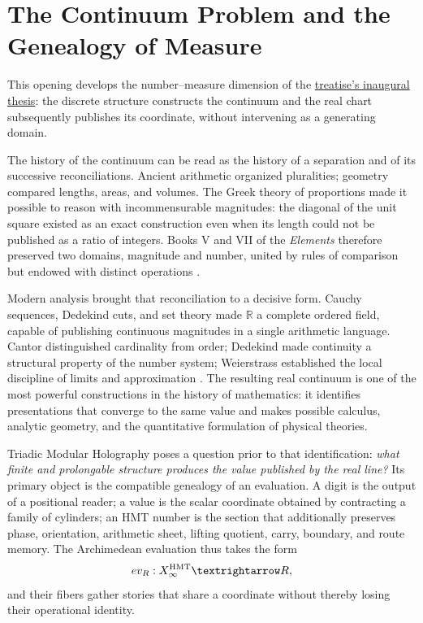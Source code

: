 
\section{The Continuum Problem and the Genealogy of Measure}
\label{sec:continuo-numero-medida-hmt-revfinal}

This opening develops the number--measure dimension of the
\hyperref[sec:tesis-inaugural-helicoidal-hmt-md]{treatise's inaugural thesis}:
the discrete structure constructs the continuum and the real chart subsequently publishes
its coordinate, without intervening as a generating domain.

The history of the continuum can be read as the history of a separation and
of its successive reconciliations. Ancient arithmetic organized
pluralities; geometry compared lengths, areas, and volumes. The Greek
theory of proportions made it possible to reason with incommensurable magnitudes:
the diagonal of the unit square existed as an exact construction even when
its length could not be published as a ratio of integers. Books V and VII
of the \emph{Elements} therefore preserved two domains, magnitude and number,
united by rules of comparison but endowed with distinct operations
\cite{EuclidElements,SEPAristotleMath}.

Modern analysis brought that reconciliation to a decisive form. Cauchy sequences, Dedekind cuts, and set theory made \(\mathbb R\) a complete ordered field, capable of publishing continuous magnitudes in a single arithmetic language. Cantor distinguished cardinality from order; Dedekind made continuity a structural property of the number system; Weierstrass established the local discipline of limits and approximation \cite{SEPDedekind,SEPContinuity,SEPSetTheory}. The resulting real continuum is one of the most powerful constructions in the history of mathematics: it identifies presentations that converge to the same value and makes possible calculus, analytic geometry, and the quantitative formulation of physical theories.

Triadic Modular Holography poses a question prior to that
identification: \emph{what finite and prolongable structure produces the value
published by the real line?} Its primary object is the compatible genealogy of
an evaluation. A digit is the output of a positional reader; a value is
the scalar coordinate obtained by contracting a family of cylinders; an HMT
number is the section that additionally preserves phase, orientation, arithmetic
sheet, lifting quotient, carry, boundary, and route
memory. The Archimedean evaluation thus takes the form
\[
 \operatorname{ev}_{\mathbb R}:X_\infty^{\rm HMT}\longrightarrow\mathbb R,
\]
and their fibers gather stories that share a coordinate without thereby losing
their operational identity.

